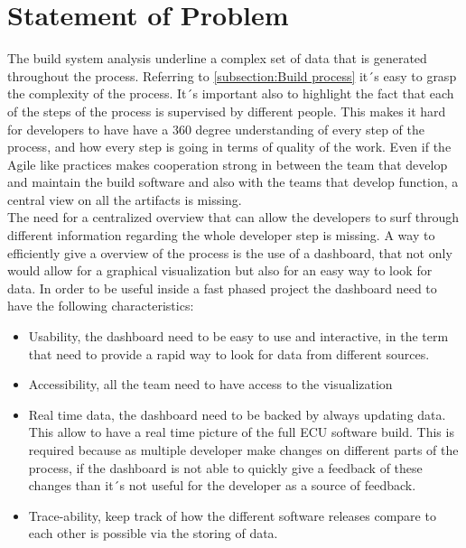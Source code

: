 \documentclass[../main.tex]{subfiles}
\begin{document}
\section{Statement of Problem}
The build system analysis underline a complex set of data that is generated throughout the process. Referring to \ref{subsection:Build process} it´s easy to grasp the complexity of the process. It´s important also to highlight the fact that each of the steps of the process is supervised by different people. This makes it hard for developers to have have a 360 degree understanding of every step of the process, and how every step is going in terms of quality of the work. Even if the Agile like practices makes cooperation strong in between the team that develop and maintain the build software and also with the teams that develop function, a central view on all the artifacts is missing.\\
The need for a centralized overview that can allow the developers to surf through different information regarding the whole developer step is missing. A way to efficiently give a overview of the process is the use of a dashboard, that not only would allow for a graphical visualization but also for an easy way to look for data. In order to be useful inside a fast phased project the dashboard need to have the following characteristics:
\begin{itemize}
    \item Usability, the dashboard need to be easy to use and interactive, in the term that need to provide a rapid way to look for data from different sources. 
    \item Accessibility, all the team need to have access to the visualization
    \item Real time data, the dashboard need to be backed by always updating data. This allow to have a real time picture of the full ECU software build. This is required because as multiple developer make changes on different parts of the process, if the dashboard is not able to quickly give a feedback of these changes than it´s not useful for the developer as a source of feedback.
    \item Trace-ability, keep track of how the different software releases compare to each other is possible via the storing of data. 
\end{itemize}
\end{document}

